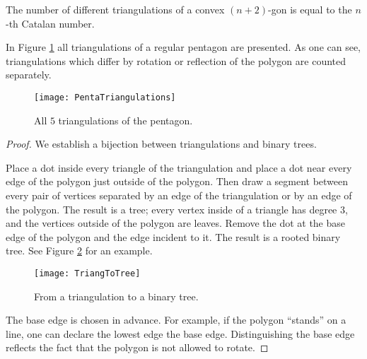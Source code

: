 \begin{page}
\setcounter{section}{4}
\setcounter{subsection}{4}
\setcounter{dfn}{6}
\label{portion:988}

\begin{thm}
The number of different triangulations of a convex $(n+2)$-gon is equal to the $n$-th Catalan number.
\end{thm}

\end{page}

\begin{page}
\setcounter{section}{4}
\setcounter{subsection}{5}
\setcounter{dfn}{6}
\label{portion:989}

In Figure \ref{fig:PentaTriangulations} all triangulations of a regular pentagon are presented.
As one can see, triangulations which differ by rotation or reflection of the polygon are counted separately.

\begin{figure}[ht]
\begin{center}
\texttt{[image: PentaTriangulations]}
\end{center}
\caption{All $5$ triangulations of the pentagon.}
\label{fig:PentaTriangulations}
\end{figure}


\begin{proof}
We establish a bijection between triangulations and binary trees.

Place a dot inside every triangle of the triangulation and place a dot near every edge of the polygon just outside of the polygon.
Then draw a segment between every pair of vertices separated by an edge of the triangulation or by an edge of the polygon.
The result is a tree; every vertex inside of a triangle has degree $3$, and the vertices outside of the polygon are leaves.
Remove the dot at the base edge of the polygon and the edge incident to it.
The result is a rooted binary tree.
See Figure \ref{fig:TriangToTree} for an example.

\begin{figure}[ht]
\begin{center}
\texttt{[image: TriangToTree]}
\end{center}
\caption{From a triangulation to a binary tree.}
\label{fig:TriangToTree}
\end{figure}

The base edge is chosen in advance.
For example, if the polygon ``stands'' on a line, one can declare the lowest edge the base edge.
Distinguishing the base edge reflects the fact that the polygon is not allowed to rotate.


\end{proof}
\end{page}
